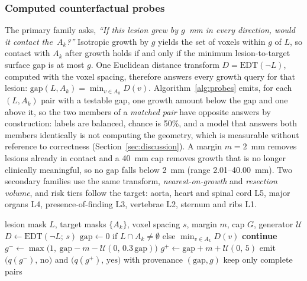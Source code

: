 \subsubsection{Computed counterfactual probes} The primary family asks,
\emph{``If this lesion grew by $g$~mm in every direction, would it contact
the~$A_k$?''} Isotropic growth by $g$ yields the set of voxels within $g$ of
$L$, so contact with $A_k$ after growth holds if and only if the minimum
lesion-to-target surface gap is at most $g$. One Euclidean distance transform
$D=\mathrm{EDT}(\lnot L)$, computed with the voxel spacing, therefore answers
every growth query for that lesion: $\mathrm{gap}(L,A_k)=\min_{v\in A_k}D(v)$.
Algorithm~\ref{alg:probes} emits, for each $(L,A_k)$ pair with a testable
gap, one growth amount below the gap and one above it, so the two members of
a \emph{matched pair} have opposite answers by construction: labels are
balanced, chance is 50\%, and a model that answers both members identically
is not computing the geometry, which is measurable without reference to
correctness (Section~\ref{sec:discussion}). A margin $m=2$~mm removes lesions already in contact and a
40~mm cap removes growth that is no longer clinically meaningful, so no gap
falls below 2~mm (range 2.01--40.00~mm). Two secondary families use the same
transform, \emph{nearest-on-growth} and \emph{resection volume}, and risk
tiers follow the target: aorta, heart and spinal cord L5, major organs L4,
presence-of-finding L3, vertebrae L2, sternum and ribs L1.

\begin{algorithm}[!t]
\caption{Computed counterfactual growth-contact probes for one lesion}
\label{alg:probes}
\begin{algorithmic}[1]
\REQUIRE lesion mask $L$, target masks $\{A_k\}$, voxel spacing $s$, margin
$m$, cap $G$, generator $\mathcal{U}$
\STATE $D \gets \mathrm{EDT}(\lnot L;\, s)$ 
  \STATE $\mathrm{gap} \gets 0$ if $L\cap A_k\neq\emptyset$ else $\min_{v\in A_k} D(v)$
    \STATE \textbf{continue} 
  \ENDIF
  \STATE $g^{-} \gets \max\!\bigl(1,\ \mathrm{gap}-m-\mathcal{U}(0,\,0.3\,\mathrm{gap})\bigr)$
  \STATE $g^{+} \gets \mathrm{gap}+m+\mathcal{U}(0,\,5)$
  \STATE emit $\bigl(q(g^{-}),\,\text{no}\bigr)$ and $\bigl(q(g^{+}),\,\text{yes}\bigr)$ with provenance $(\mathrm{gap}, g)$
\ENDFOR
\STATE keep only complete pairs
\end{algorithmic}
\end{algorithm}

